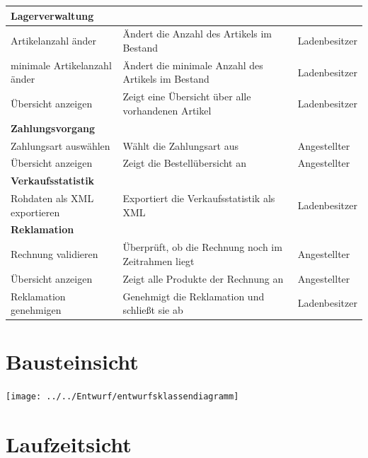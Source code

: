 \documentclass[pdftex,12pt,a4paper]{article}
\begin{document}
\newpage
\begin{tabular}{|p{\third}|p{\third}|p{\third}|} \hline
\multicolumn{3}{|l|}{\textbf{Lagerverwaltung}}\\ \hline
Artikelanzahl \"ander & \"Andert die Anzahl des Artikels im Bestand & Ladenbesitzer\\ \hline
minimale Artikelanzahl \"ander & \"Andert die  minimale Anzahl des Artikels im Bestand & Ladenbesitzer \\ \hline
\"Ubersicht anzeigen & Zeigt eine \"Ubersicht \"uber alle vorhandenen Artikel & Ladenbesitzer\\ \hline
\multicolumn{3}{|l|}{\textbf{Zahlungsvorgang}}\\ \hline
Zahlungsart ausw\"ahlen & W\"ahlt die Zahlungsart aus & Angestellter\\ \hline
\"Ubersicht anzeigen & Zeigt die Bestell\"ubersicht an & Angestellter\\ \hline
\multicolumn{3}{|l|}{\textbf{Verkaufsstatistik}}\\ \hline
Rohdaten als XML exportieren & Exportiert die Verkaufsstatistik als XML & Ladenbesitzer\\ \hline
\multicolumn{3}{|l|}{\textbf{Reklamation}}\\ \hline
Rechnung validieren & \"Uberpr\"uft, ob die Rechnung noch im Zeitrahmen liegt & Angestellter\\ \hline
\"Ubersicht anzeigen & Zeigt alle Produkte der Rechnung an & Angestellter\\ \hline
Reklamation genehmigen & Genehmigt die Reklamation und schlie\ss{}t sie ab & Ladenbesitzer\\ \hline
\end{tabular}

\section{Bausteinsicht}
\texttt{[image: ../../Entwurf/entwurfsklassendiagramm]}

\section{Laufzeitsicht}
\end{document}
